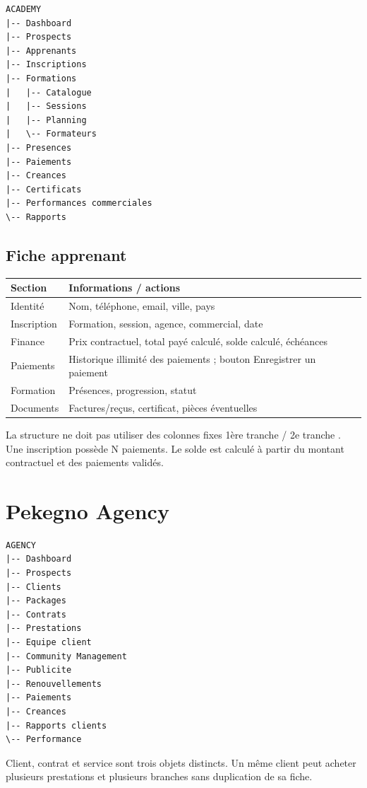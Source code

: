 \documentclass[11pt,a4paper]{article}
\newcommand{\tableheader}[2]{\textbf{#1} & \textbf{#2} \\ \hline}
\begin{document}
\begin{verbatim}
ACADEMY
|-- Dashboard
|-- Prospects
|-- Apprenants
|-- Inscriptions
|-- Formations
|   |-- Catalogue
|   |-- Sessions
|   |-- Planning
|   \-- Formateurs
|-- Presences
|-- Paiements
|-- Creances
|-- Certificats
|-- Performances commerciales
\-- Rapports
\end{verbatim}

\subsection{Fiche apprenant}

\begin{tabularx}{\textwidth}{|l|X|}
\hline
\tableheader{Section}{Informations / actions}
Identité & Nom, téléphone, email, ville, pays \\ \hline
Inscription & Formation, session, agence, commercial, date \\ \hline
Finance & Prix contractuel, total payé calculé, solde calculé, échéances \\ \hline
Paiements & Historique illimité des paiements ; bouton Enregistrer un paiement \\ \hline
Formation & Présences, progression, statut \\ \hline
Documents & Factures/reçus, certificat, pièces éventuelles \\ \hline
\end{tabularx}

La structure ne doit pas utiliser des colonnes fixes \og 1ère tranche / 2e tranche \fg. Une inscription possède N paiements. Le solde est calculé à partir du montant contractuel et des paiements validés.

\section{Pekegno Agency}

\begin{verbatim}
AGENCY
|-- Dashboard
|-- Prospects
|-- Clients
|-- Packages
|-- Contrats
|-- Prestations
|-- Equipe client
|-- Community Management
|-- Publicite
|-- Renouvellements
|-- Paiements
|-- Creances
|-- Rapports clients
\-- Performance
\end{verbatim}

Client, contrat et service sont trois objets distincts. Un même client peut acheter plusieurs prestations et plusieurs branches sans duplication de sa fiche.
\end{document}
